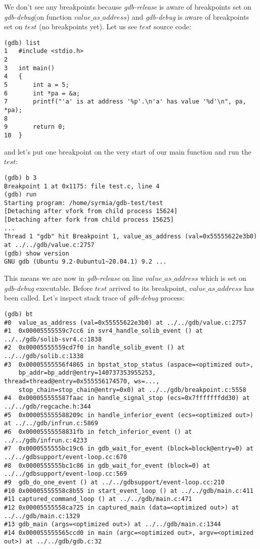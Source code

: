 \documentclass{report}
\begin{document}
We don't see any breakpoints because \textit{gdb-release} is aware of breakpoints set on \textit{gdb-debug}(on function $value\_as\_address$) and \textit{gdb-debug} is aware of breakpoints set on $test$ (no breakpoints yet). Let us see $test$ source  code:
\begin{verbatim}
(gdb) list
1   #include <stdio.h>
2	
3	int main()
4	{
5		int a = 5;
6		int *pa = &a;
7		printf("'a' is at address '%p'.\n'a' has value '%d'\n", pa, *pa);
8	
9		return 0;
10	}
\end{verbatim}
and let's put one breakpoint on the very start of our main function and run the $test$:
\begin{verbatim}
(gdb) b 3
Breakpoint 1 at 0x1175: file test.c, line 4
(gdb) run
Starting program: /home/syrmia/gdb-test/test 
[Detaching after vfork from child process 15624]
[Detaching after fork from child process 15625]
...
Thread 1 "gdb" hit Breakpoint 1, value_as_address (val=0x55555622e3b0) at ../../gdb/value.c:2757
(gdb) show version
GNU gdb (Ubuntu 9.2-0ubuntu1~20.04.1) 9.2 ...
\end{verbatim}
This means we are now in \textit{gdb-release} on line $value\_as\_address$ which is set on \textit{gdb-debug} executable. Before $test$ arrived to its breakpoint, $value\_as\_address$ has been called. Let's inspect stack trace of \textit{gdb-debug} process:
\begin{verbatim}
(gdb) bt
#0  value_as_address (val=0x55555622e3b0) at ../../gdb/value.c:2757
#1  0x00005555559c7cc6 in svr4_handle_solib_event () at ../../gdb/solib-svr4.c:1838
#2  0x00005555559cd7f0 in handle_solib_event () at ../../gdb/solib.c:1338
#3  0x00005555556f4865 in bpstat_stop_status (aspace=<optimized out>, 
    bp_addr=bp_addr@entry=140737353955253, thread=thread@entry=0x555556174570, ws=..., 
    stop_chain=stop_chain@entry=0x0) at ../../gdb/breakpoint.c:5558
#4  0x000055555587faac in handle_signal_stop (ecs=0x7fffffffdd30) at ../../gdb/regcache.h:344
#5  0x000055555588209c in handle_inferior_event (ecs=<optimized out>) at ../../gdb/infrun.c:5869
#6  0x00005555558831fb in fetch_inferior_event () at ../../gdb/infrun.c:4233
#7  0x0000555555bc19c6 in gdb_wait_for_event (block=block@entry=0) at ../../gdbsupport/event-loop.cc:670
#8  0x0000555555bc1c86 in gdb_wait_for_event (block=0) at ../../gdbsupport/event-loop.cc:569
#9  gdb_do_one_event () at ../../gdbsupport/event-loop.cc:210
#10 0x00005555558c8b55 in start_event_loop () at ../../gdb/main.c:411
#11 captured_command_loop () at ../../gdb/main.c:471
#12 0x00005555558ca725 in captured_main (data=<optimized out>) at ../../gdb/main.c:1329
#13 gdb_main (args=<optimized out>) at ../../gdb/main.c:1344
#14 0x000055555565ccd0 in main (argc=<optimized out>, argv=<optimized out>) at ../../gdb/gdb.c:32
\end{verbatim}
\end{document}
